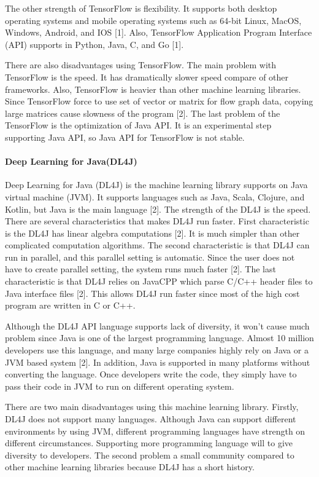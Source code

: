 \documentclass[article, onecolumn, draftclsnofoot,10pt, compsoc]{IEEEtran}
\begin{document}
The other strength of TensorFlow is flexibility. It supports both desktop operating systems and mobile operating systems such as 64-bit Linux, MacOS, Windows, Android, and IOS [1]. Also, TensorFlow Application Program Interface (API) supports in Python, Java, C, and Go [1].

There are also disadvantages using TensorFlow. The main problem with TensorFlow is the speed. It has dramatically slower speed compare of other frameworks. Also, TensorFlow is heavier than other machine learning libraries. Since TensorFlow force to use set of vector or matrix for flow graph data, copying large matrices cause slowness of the program [2]. The last problem of the TensorFlow is the optimization of Java API. It is an experimental step supporting Java API, so Java API for TensorFlow is not stable.

\paragraph{Deep Learning for Java(DL4J)}
Deep Learning for Java (DL4J) is the machine learning library supports on Java virtual machine (JVM). It supports languages such as Java, Scala, Clojure, and Kotlin, but Java is the main language [2]. The strength of the DL4J is the speed. There are several characteristics that makes DL4J run faster. First characteristic is the DL4J has linear algebra computations [2]. It is much simpler than other complicated computation algorithms. The second characteristic is that DL4J can run in parallel, and this parallel setting is automatic. Since the user does not have to create parallel setting, the system runs much faster [2]. The last characteristic is that DL4J relies on JavaCPP which parse C/C++ header files to Java interface files [2]. This allows DL4J run faster since most of the high cost program are written in C or C++.

Although the DL4J API language supports lack of diversity, it won\rq t cause much problem since Java is one of the largest programming language. Almost 10 million developers use this language, and many large companies highly rely on Java or a JVM based system [2]. In addition, Java is supported in many platforms without converting the language. Once developers write the code, they simply have to pass their code in JVM to run on different operating system.

There are two main disadvantages using this machine learning library. Firstly, DL4J does not support many languages. Although Java can support different environments by using JVM, different programming languages have strength on different circumstances. Supporting more programming language will to give diversity to developers. The second problem a small community compared to other machine learning libraries because DL4J has a short history.
\end{document}
